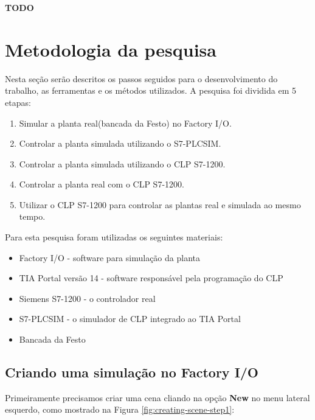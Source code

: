 \documentclass[a4paper, 12pt]{article}
\begin{document}
		\textbf{TODO}

\section{Metodologia da pesquisa}
	
	Nesta seção serão descritos os passos seguidos para o desenvolvimento do trabalho,
	as ferramentas e os métodos utilizados.
	A pesquisa foi dividida em 5 etapas:
	\begin{enumerate}
		\item Simular a planta real(bancada da Festo) no Factory I/O.
		\item Controlar a planta simulada utilizando o S7-PLCSIM.
		\item Controlar a planta simulada utilizando o CLP S7-1200.
		\item Controlar a planta real com o CLP S7-1200.
		\item Utilizar o CLP S7-1200 para controlar as plantas real e simulada ao mesmo tempo.
	\end{enumerate}
	
	Para esta pesquisa foram utilizadas os seguintes materiais:
		
	\begin{itemize}
		\item Factory I/O - software para simulação da planta
		\item TIA Portal versão 14 - software responsável pela programação do CLP
		\item Siemens S7-1200 - o controlador real
		\item S7-PLCSIM - o simulador de CLP integrado ao TIA Portal
		\item Bancada da Festo
	\end{itemize}
	
	\subsection{Criando uma simulação no Factory I/O}
	
		Primeiramente precisamos criar uma cena cliando na opção \textbf{New} no menu lateral esquerdo, como mostrado na
		Figura \ref{fig:creating-scene-step1}:
	
\end{document}
